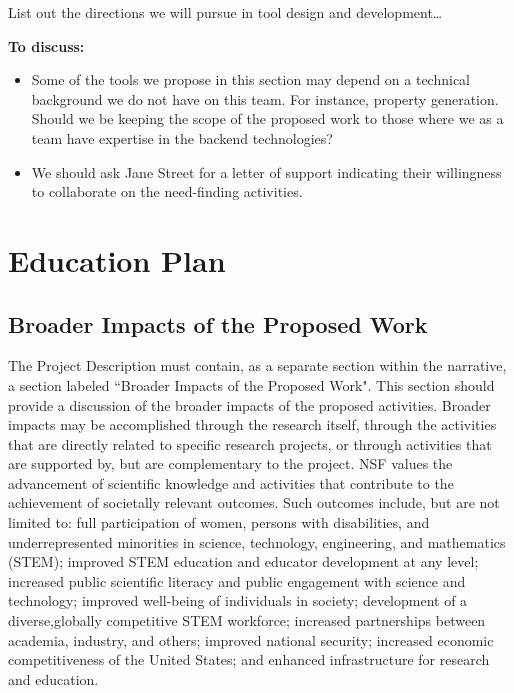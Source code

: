 List out the directions we will pursue in tool design and development\ldots{}

\textbf{To discuss:}

\begin{itemize}

\item Some of the tools we propose in this section may depend on a technical 
background we do not have on this team. For instance, property generation.  
Should we be keeping the scope of the proposed work to those where we as a team 
have expertise in the backend technologies?

\item We should ask Jane Street for a letter of support indicating their 
willingness to collaborate on the need-finding activities.

\end{itemize}



\section{Education Plan}

\subsection{Broader Impacts of the Proposed Work}
The Project Description must contain, as a separate section within the narrative, a section labeled ``Broader
Impacts of the Proposed Work". This section should provide a discussion of the broader impacts of the proposed
activities. Broader impacts may be accomplished through the research itself, through the activities that are
directly related to specific research projects, or through activities that are supported by, but are complementary to 
the project. NSF values the advancement of scientific knowledge and activities that contribute to the
achievement of societally relevant outcomes. Such outcomes include, but are not limited to: full
participation of women, persons with disabilities, and underrepresented minorities in science, technology, engineering, and
mathematics (STEM); improved STEM education and educator development at any level; increased public
scientific literacy and public engagement with science and technology; improved well-being of individuals in
society; development of a diverse,globally competitive STEM workforce; increased partnerships between
academia, industry, and others; improved national security; increased economic competitiveness of the United
States; and enhanced infrastructure for research and education.

